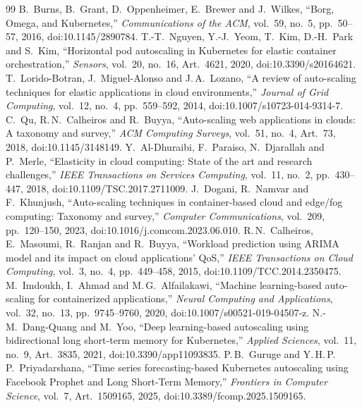 \documentclass[conference,a4paper]{IEEEtran}
\begin{document}
\begin{thebibliography}{99}\footnotesize
 B.\ Burns, B.\ Grant, D.\ Oppenheimer, E.\ Brewer and J.\ Wilkes, ``Borg, Omega, and Kubernetes,'' \textit{Communications of the ACM}, vol.~59, no.~5, pp.~50--57, 2016, doi:10.1145/2890784.
 T.-T.\ Nguyen, Y.-J.\ Yeom, T.\ Kim, D.-H.\ Park and S.\ Kim, ``Horizontal pod autoscaling in Kubernetes for elastic container orchestration,'' \textit{Sensors}, vol.~20, no.~16, Art.~4621, 2020, doi:10.3390/s20164621.
 T.\ Lorido-Botran, J.\ Miguel-Alonso and J.\,A.\ Lozano, ``A review of auto-scaling techniques for elastic applications in cloud environments,'' \textit{Journal of Grid Computing}, vol.~12, no.~4, pp.~559--592, 2014, doi:10.1007/s10723-014-9314-7.
 C.\ Qu, R.\,N.\ Calheiros and R.\ Buyya, ``Auto-scaling web applications in clouds: A taxonomy and survey,'' \textit{ACM Computing Surveys}, vol.~51, no.~4, Art.~73, 2018, doi:10.1145/3148149.
 Y.\ Al-Dhuraibi, F.\ Paraiso, N.\ Djarallah and P.\ Merle, ``Elasticity in cloud computing: State of the art and research challenges,'' \textit{IEEE Transactions on Services Computing}, vol.~11, no.~2, pp.~430--447, 2018, doi:10.1109/TSC.2017.2711009.
 J.\ Dogani, R.\ Namvar and F.\ Khunjush, ``Auto-scaling techniques in container-based cloud and edge/fog computing: Taxonomy and survey,'' \textit{Computer Communications}, vol.~209, pp.~120--150, 2023, doi:10.1016/j.comcom.2023.06.010.
 R.\,N.\ Calheiros, E.\ Masoumi, R.\ Ranjan and R.\ Buyya, ``Workload prediction using ARIMA model and its impact on cloud applications' QoS,'' \textit{IEEE Transactions on Cloud Computing}, vol.~3, no.~4, pp.~449--458, 2015, doi:10.1109/TCC.2014.2350475.
 M.\ Imdoukh, I.\ Ahmad and M.\,G.\ Alfailakawi, ``Machine learning-based auto-scaling for containerized applications,'' \textit{Neural Computing and Applications}, vol.~32, no.~13, pp.~9745--9760, 2020, doi:10.1007/s00521-019-04507-z.
 N.-M.\ Dang-Quang and M.\ Yoo, ``Deep learning-based autoscaling using bidirectional long short-term memory for Kubernetes,'' \textit{Applied Sciences}, vol.~11, no.~9, Art.~3835, 2021, doi:10.3390/app11093835.
 P.\,B.\ Guruge and Y.\,H.\,P.\,P.\ Priyadarshana, ``Time series forecasting-based Kubernetes autoscaling using Facebook Prophet and Long Short-Term Memory,'' \textit{Frontiers in Computer Science}, vol.~7, Art.~1509165, 2025, doi:10.3389/fcomp.2025.1509165.

\end{thebibliography}
\end{document}
